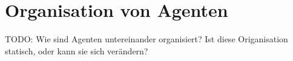 \chapter{Organisation von Agenten}

TODO: Wie sind Agenten untereinander organisiert? Ist diese Origanisation statisch, oder kann sie sich verändern?